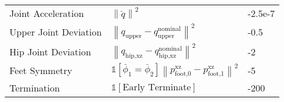 \begin{table}[t]
{\begin{tabular}{l|l|l}
Joint Acceleration       & $\left \| \ddot{q} \right \|^2$                                                                                                                                                            & -2.5e-7                    \\
Upper Joint Deviation    & $\left \| q_\text{upper} - q^\text{nominal}_{\text{upper}} \right \|^2$                                                                                                                                             & -0.5                       \\
Hip Joint Deviation      & $\left \| q_{\text{hip},\text{xz}} - q^\text{nominal}_{\text{hip}, \text{xz}} \right \|^2$             
& -2                         \\
Feet Symmetry         & $\mathds{1} [\bar \phi_1 = \bar \phi_2] \left \| p_\text{foot,0}^{\text{xz}}-p_\text{foot,1}^{\text{xz}} \right \|^2$                                                                                                        & -5                        \\
Termination & $\mathds{1} [\text{Early Terminate}]$ & -200 \\ \bottomrule
\end{tabular}}
\vspace{-6pt}
\end{table}